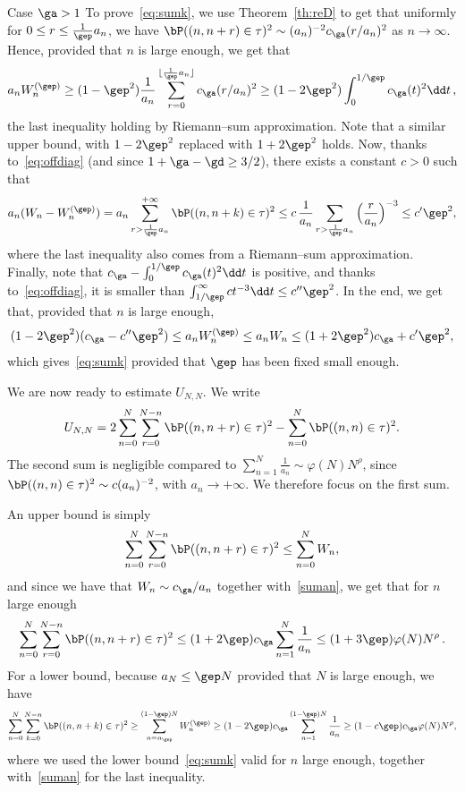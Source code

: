 \begin{appendix}
\begin{proofc}
\begin{step}{Case $\ga > 1$}
To prove~\eqref{eq:sumk}, we use Theorem~\ref{th:reD} to get that uniformly for $0\leq r\leq \tfrac 1\gep a_n$, we have $\bP((n,n+r) \in \tau)^2 \sim (a_n)^{-2} c_{\ga}(r/a_n)^2$ as $n\to\infty$. Hence, provided that $n$ is large enough, we get that
\[
a_n W_n^{(\gep)} \geq (1-\gep^2) \frac{1}{a_n} \sum_{r=0}^{\lfloor\frac1\gep a_n \rfloor} c_{\ga}(r/a_n)^2 \geq (1-2\gep^2) \int_{0}^{1/\gep} c_{\ga}(t)^2 \dd t\,,
\]
the last inequality holding by Riemann--sum approximation. Note that a similar upper bound, with $1-2\gep^2$ replaced with $1+2\gep^2$ holds. Now, thanks to~\eqref{eq:offdiag} (and since $1+\ga-\gd \geq 3/2$), there exists a constant $c>0$ such that
\[
a_n(W_n-W_n^{(\gep)}) = a_n \sum_{r > \frac1\gep a_n}^{+\infty} \bP((n,n+k) \in \tau)^2 \leq c\,\frac{1}{a_n} \sum_{r>\frac1\gep a_n} \Big(\frac{r}{a_n} \Big)^{-3} \leq c' \gep^2,
\]
where the last inequality also comes from a Riemann--sum approximation. Finally, note that $c_\ga -\int_{0}^{1/\gep} c_{\ga}(t)^2 \dd t $ is positive, and thanks to~\eqref{eq:offdiag}, it is smaller than $\int_{1/\gep}^{\infty} c t^{-3} \dd t \leq c'' \gep^2$. In the end, we get that, provided that $n$ is large enough,
\begin{equation}
(1-2\gep^2) (c_{\ga} - c'' \gep^2) \leq a_n W_n^{(\gep)} \leq a_n W_n \leq (1+2\gep^2) c_{\ga} + c' \gep^2,
\end{equation}
which gives~\eqref{eq:sumk} provided that $\gep$ has been fixed small enough.
\end{step}

We are now ready to estimate $U_{N,N}$. We write
\[
U_{N,N} = 2\sum_{n=0}^{N} \sum_{r=0}^{N-n} \bP((n,n+r) \in\tau)^2 - \sum_{n=0}^N \bP((n,n)\in\tau)^2.
\]
The second sum is negligible compared to $\sum_{n=1}^N \tfrac{1}{a_n}\sim \varphi(N) N^{\rho}$, since $\bP({(n,n)\in\tau})^2 \sim c (a_n)^{-2}$, with $a_n \to +\infty$. We therefore focus on the first sum.

An upper bound is simply
\[
\sum_{n=0}^N \sum_{r=0}^{N-n} \bP((n,n+r) \in\tau)^2 \leq \sum_{n=0}^N W_n,
\]
and since we have that $W_n \sim c_{\ga}/a_n$ together with~\eqref{suman}, we get that for $n$ large enough
\[
\sum_{n=0}^N \sum_{r=0}^{N-n} \bP((n,n+r) \in\tau)^2 \leq (1+2\gep) c_{\ga} \sum_{n=1}^N \frac{1}{a_n} \leq (1+3\gep) \varphi(N) N^{\rho}\,.
\]
For a lower bound, because $a_N\leq \gep N$ provided that $N$ is large enough, we have
\[
\sum_{n=0}^{N} \sum_{k=0}^{N-n} \bP((n,n+k) \in\tau)^2 \geq \sum_{n=n_{\gep}}^{(1-\gep) N} W_n^{(\gep)} \geq (1-2\gep) c_{\ga} \sum_{n=1}^{(1-\gep)N} \frac{1}{a_n} \geq (1- c\gep)c_{\ga} \varphi(N) N^{\rho},
\]
where we used the lower bound~\eqref{eq:sumk} valid for $n$ large enough, together with~\eqref{suman} for the last inequality.


\end{proofc}
\end{appendix}
